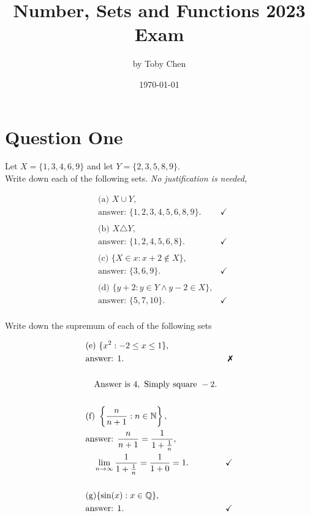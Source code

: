 \documentclass{article}
\title{Number, Sets and Functions 2023 Exam}
\author{by Toby Chen}
\date{\today}
\newcommand{\xmark}{\text{\ding{55}}}
\begin{document}
    \maketitle

    \tableofcontents

    \section{Question One}
        Let $X = \{1,3,4,6,9\}$ and let $Y = \{2,3,5,8,9\}$.\\ Write down each of the following sets. \textit{No justification is needed},

        \begin{align*}
            &\text{(a) } X\cup Y,\\
            &\text{answer: } \{1,2,3,4,5,6,8,9\}. &\checkmark\\
            &\\
            &\text{(b) }X\triangle Y,\\
            &\text{answer: } \{1,2,4,5,6,8\}. &\checkmark\\
            &\\
            &\text{(c) } \{X\in x: x+2 \notin X\},\\
            &\text{answer: } \{3,6,9\}. &\checkmark\\
            &\\
            &\text{(d) } \{y+2 : y\in Y \land y-2 \in X\},\\
            &\text{answer: } \{5,7,10\}. &\checkmark\\
        \end{align*}

        Write down the supremum of each of the following sets

        \begin{align*}
            &\text{(e) } \{x^2 : -2 \leq x \leq 1\},\\
            &\text{answer: } 1.&\xmark\\
            &\\
            &\quad\text{Answer is }4, \text{ Simply square }-2.\\
            &\\
            &\text{(f) } \left\{\frac{n}{n+1}: n \in \mathbb{N}\right\},\\
            &\text{answer: } \frac{n}{n+1} = \frac{1}{1 + \frac{1}{n}},\\
            &\quad\lim_{n\rightarrow \infty}\frac{1}{1 + \frac{1}{n}} = \frac{1}{1 + 0} = 1.&\checkmark\\
            &\\
            &\text{(g)} \{\sin(x) : x\in \mathbb{Q}\},\\
            &\text{answer: }1. &\checkmark\\
        \end{align*}
\end{document}
